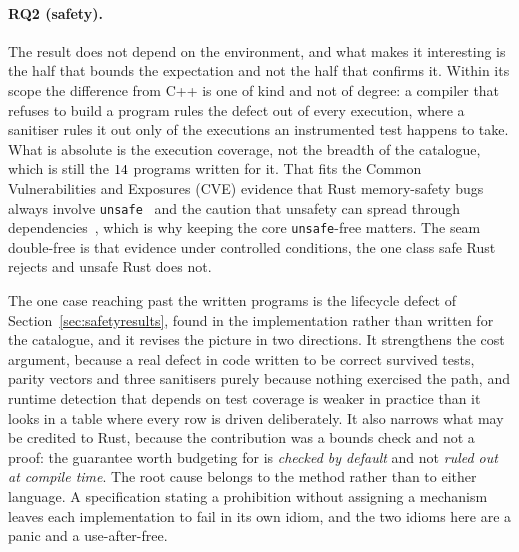 \documentclass[english,oneside,a4paper,censored,csm,software-track-2020]{HYthesisML}
\begin{document}
\paragraph{RQ2 (safety).} The result does not depend on the environment, and what makes it
interesting is the half that bounds the expectation and not the half that confirms it. Within
its scope the difference from C++ is one of kind and not of degree: a compiler that refuses to
build a program rules the defect out of every execution, where a sanitiser rules it out only of
the executions an instrumented test happens to take. What is absolute is the execution coverage,
not the breadth of the catalogue, which is still the $14$ programs written for it. That
fits the Common Vulnerabilities and Exposures (CVE) evidence that Rust memory-safety bugs always
involve
\texttt{unsafe}~\cite{xu2021rustcve} and the caution that unsafety can spread through
dependencies~\cite{evans2020rust}, which is why keeping the core \texttt{unsafe}-free matters. The
seam double-free is that evidence under controlled conditions, the one class safe Rust rejects and
unsafe Rust does not.

The one case reaching past the written programs is the lifecycle defect of
Section~\ref{sec:safetyresults}, found in the implementation rather than written for the
catalogue, and it revises the picture in two directions. It strengthens the cost argument, because
a real defect in code written to be correct survived tests, parity vectors and three sanitisers
purely because nothing exercised the path, and runtime detection that depends on test coverage is
weaker in practice than it looks in a table where every row is driven deliberately. It also
narrows what may be credited to Rust, because the contribution was a bounds check and not a
proof: the guarantee worth budgeting for is \emph{checked by default} and not \emph{ruled out at
compile time}. The root cause belongs to the method rather than to either language. A
specification stating a prohibition without assigning a mechanism leaves each implementation to
fail in its own idiom, and the two idioms here are a panic and a use-after-free.
\end{document}
